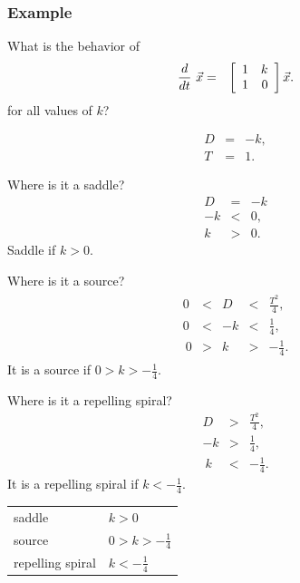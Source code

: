 \begin{frame}
  \frametitle{Example}

  What is the behavior of
  \begin{eqnarray*}
    \deriv{~}{t} \vec{x} & = & \arrayTwo{1}{k}{1}{0} \vec{x}.
  \end{eqnarray*}
  for all values of $k$?

  {
    \begin{eqnarray*}
      D & = & -k, \\
      T & = & 1.
    \end{eqnarray*}
  }



  {
    Where is it a saddle?
    \begin{eqnarray*}
      D & = & -k \\
      -k & < & 0, \\ 
      k & > & 0.
    \end{eqnarray*}
    Saddle if $k>0$.
  }

  {
    Where is it a source?
    \begin{eqnarray*}
      \begin{array}{rcccl}
        0 & < & D & < & \frac{T^2}{4}, \\
        0 & < & -k & < & \frac{1}{4}, \\\
        0 & > &  k & > & -\frac{1}{4}.
      \end{array}
    \end{eqnarray*}
    It is a source if $0 > k  > -\frac{1}{4}$.
  }

  {
    Where is it a repelling spiral?
    \begin{eqnarray*}
        D  & > & \frac{T^2}{4}, \\
        -k & > & \frac{1}{4}, \\\
        k  & < & -\frac{1}{4}.
    \end{eqnarray*}
    It is a repelling spiral if $k < -\frac{1}{4}$.  

  }

  {
    \begin{tabular}{ll}
      saddle           & $k>0$\\
      source           & $0 > k  > -\frac{1}{4}$ \\
      repelling spiral & $k < -\frac{1}{4}$
    \end{tabular}
  }
  

\end{frame}


